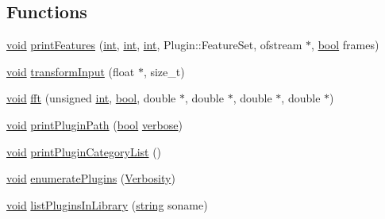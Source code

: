\subsection*{Functions}
\begin{DoxyCompactItemize}
\item 
\hyperlink{sound_8c_ae35f5844602719cf66324f4de2a658b3}{void} \hyperlink{vamp-simple-host_8cpp_a81f8bc89ed9194159bfb1f2b4d7a7ac4}{print\+Features} (\hyperlink{xmltok_8h_a5a0d4a5641ce434f1d23533f2b2e6653}{int}, \hyperlink{xmltok_8h_a5a0d4a5641ce434f1d23533f2b2e6653}{int}, \hyperlink{xmltok_8h_a5a0d4a5641ce434f1d23533f2b2e6653}{int}, Plugin\+::\+Feature\+Set, ofstream $\ast$, \hyperlink{mac_2config_2i386_2lib-src_2libsoxr_2soxr-config_8h_abb452686968e48b67397da5f97445f5b}{bool} frames)
\item 
\hyperlink{sound_8c_ae35f5844602719cf66324f4de2a658b3}{void} \hyperlink{vamp-simple-host_8cpp_ae610372882497afdeaf180a7e53eb00b}{transform\+Input} (float $\ast$, size\+\_\+t)
\item 
\hyperlink{sound_8c_ae35f5844602719cf66324f4de2a658b3}{void} \hyperlink{vamp-simple-host_8cpp_ab40a86a032d0cf473d15fed3616ccc57}{fft} (unsigned \hyperlink{xmltok_8h_a5a0d4a5641ce434f1d23533f2b2e6653}{int}, \hyperlink{mac_2config_2i386_2lib-src_2libsoxr_2soxr-config_8h_abb452686968e48b67397da5f97445f5b}{bool}, double $\ast$, double $\ast$, double $\ast$, double $\ast$)
\item 
\hyperlink{sound_8c_ae35f5844602719cf66324f4de2a658b3}{void} \hyperlink{vamp-simple-host_8cpp_a4767f8c142ee0b61ba414df1b0376a01}{print\+Plugin\+Path} (\hyperlink{mac_2config_2i386_2lib-src_2libsoxr_2soxr-config_8h_abb452686968e48b67397da5f97445f5b}{bool} \hyperlink{mm_8c_ab421ea2a103f8a57c338dc30e3cf4f6b}{verbose})
\item 
\hyperlink{sound_8c_ae35f5844602719cf66324f4de2a658b3}{void} \hyperlink{vamp-simple-host_8cpp_af771864c41f23e5755ed99e8ac6609a5}{print\+Plugin\+Category\+List} ()
\item 
\hyperlink{sound_8c_ae35f5844602719cf66324f4de2a658b3}{void} \hyperlink{vamp-simple-host_8cpp_a80dad9e80d85fdf86b7714bf1b3c1017}{enumerate\+Plugins} (\hyperlink{vamp-simple-host_8cpp_abf3be10d03894afb391f3a2935e3b313}{Verbosity})
\item 
\hyperlink{sound_8c_ae35f5844602719cf66324f4de2a658b3}{void} \hyperlink{vamp-simple-host_8cpp_a4d02c3d9ebe7bedb3a4c3a116479e334}{list\+Plugins\+In\+Library} (\hyperlink{test__lib_f_l_a_c_2format_8c_ab02026ad0de9fb6c1b4233deb0a00c75}{string} soname)
\item 

\end{DoxyCompactItemize}
